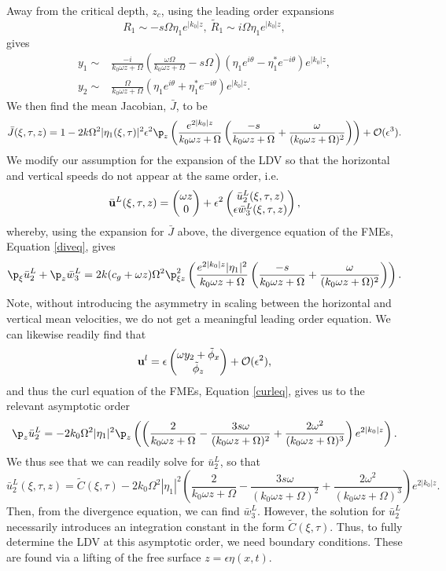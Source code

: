 \documentclass{JFM_Style/jfm}
\newcommand{\bp}{\begin{pmatrix}}
\newcommand{\ep}{\end{pmatrix}}
\begin{document}
Away from the critical depth, $z_{c}$, using the leading order expansions
\[
R_{1} \sim -s\Omega\eta_{1}e^{|k_{0}|z}, ~ \tilde{R}_{1} \sim i\Omega\eta_{1}e^{|k_{0}|z},
\]
gives
\begin{align*}
y_{1} \sim & \frac{-i}{k_{0}\omega z + \Omega}\left(\frac{\omega\Omega}{k_{0}\omega z + \Omega} - s\Omega \right)(\eta_{1}e^{i\theta} - \eta_{1}^{\ast}e^{-i\theta})e^{|k_{0}|z},\\
y_{2} \sim & \frac{\Omega}{k_{0}\omega z + \Omega}(\eta_{1}e^{i\theta} + \eta^{\ast}_{1}e^{-i\theta})e^{|k_{0}|z}.
\end{align*}
We then find the mean Jacobian, $\bar{J}$, to be
\[
\bar{J}(\xi,\tau,z) = 1 -2k\Omega^{2}|\eta_{1}(\xi,\tau)|^{2}\epsilon^{2}\p_{z}\left(\frac{e^{2|k_{0}|z}}{k_{0}\omega z + \Omega}\left(\frac{-s}{k_{0}\omega z + \Omega} + \frac{\omega}{(k_{0}\omega z + \Omega)^{2}}\right)\right) + \mathcal{O}(\epsilon^{3}).
\]
We modify our assumption for the expansion of the LDV so that the horizontal and vertical speeds do not appear at the same order, i.e.
\[
\bar{{\bf u}}^{L}(\xi,\tau,z) = \bp \omega z \\ 0 \ep + \epsilon^{2} \bp \bar{u}^{L}_{2}(\xi,\tau,z) \\ \epsilon \bar{w}^{L}_{3}(\xi,\tau,z)\ep,
\]
whereby, using the expansion for $\bar{J}$ above, the divergence equation of the FMEs, Equation \eqref{diveq}, gives
\[
\p_{\xi}\bar{u}^{L}_{2} + \p_{z}\bar{w}^{L}_{3} = 2k(c_{g}+\omega z)\Omega^{2}\p_{\xi z}^{2}\left(\frac{e^{2|k_{0}|z}|\eta_{1}|^{2}}{k_{0}\omega z + \Omega}\left(\frac{-s}{k_{0}\omega z + \Omega} + \frac{\omega}{(k_{0}\omega z + \Omega)^{2}}\right)\right) .
\]
Note, without introducing the asymmetry in scaling between the horizontal and vertical mean velocities, we do not get a meaningful leading order equation.  We can likewise readily find that
\[
{\bf u}^{l} = \epsilon \bp \omega y_{2} + \tilde{\phi}_{x} \\ \tilde{\phi}_{z} \ep + \mathcal{O}(\epsilon^{2}),
\]
and thus the curl equation of the FMEs, Equation \eqref{curleq}, gives us to the relevant asymptotic order
\[
\p_{z}\bar{u}^{L}_{2} =  -2k_{0}\Omega^{2} |\eta_{1}|^{2}\p_{z}\left(\left(\frac{2}{k_{0}\omega z + \Omega} - \frac{3s\omega}{(k_{0}\omega z + \Omega)^{2}}+\frac{2\omega^{2}}{(k_{0}\omega z + \Omega)^{3}}\right)e^{2|k_{0}|z}\right).
\]
We thus see that we can readily solve for $\bar{u}^{L}_{2}$, so that
\[
\bar{u}^{L}_{2}(\xi,\tau,z) = \tilde{C}(\xi,\tau)  -2k_{0}\Omega^{2} |\eta_{1}|^{2} \left(\frac{2}{k_{0}\omega z + \Omega} - \frac{3s\omega}{(k_{0}\omega z + \Omega)^{2}}+\frac{2\omega^{2}}{(k_{0}\omega z + \Omega)^{3}}\right)e^{2|k_{0}|z}.
\]
Then, from the divergence equation, we can find $\bar{w}^{L}_{3}$.  However, the solution for $\bar{u}^{L}_{2}$ necessarily introduces an integration constant in the form $\tilde{C}(\xi,\tau)$.  Thus, to fully determine the LDV at this asymptotic order, we need boundary conditions.  These are found via a lifting of the free surface $z=\epsilon \eta(x,t)$.
\end{document}
